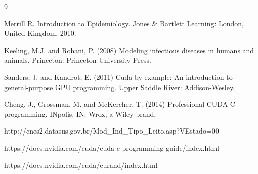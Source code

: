 \documentclass[
	12pt,				%
	openright,			%
	oneside,			%
	a4paper,			%
	english,			%
	french,				%
	spanish,			%
	brazil				%
	]{abntex2}
\begin{document}

\begin{thebibliography}{9}


Merrill R. Introduction to Epidemiology. Jones \& Bartlett Learning: London, United Kingdom, 2010.

Keeling, M.J. and Rohani, P. (2008) Modeling infectious diseases in humans and animals. Princeton: Princeton University Press.

Sanders, J. and Kandrot, E. (2011) Cuda by example: An introduction to general-purpose GPU programming. Upper Saddle River: Addison-Wesley.

Cheng, J., Grossman, M. and McKercher, T. (2014) Professional CUDA\textregistered{} C programming. INpolis, IN: Wrox, a Wiley brand.

http://cnes2.datasus.gov.br/Mod\_Ind\_Tipo\_Leito.asp?VEstado=00

https://docs.nvidia.com/cuda/cuda-c-programming-guide/index.html

https://docs.nvidia.com/cuda/curand/index.html



\end{thebibliography}
\end{document}

